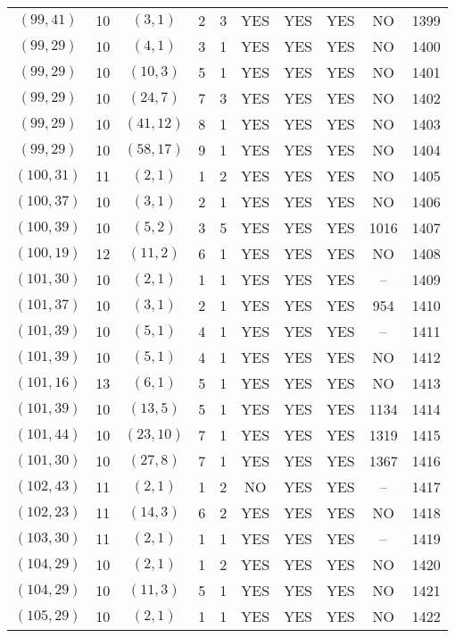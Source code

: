 \begin{longtable}{|c|c|c|c|c|c|c|c|c|c|}
$(99, 41)$ & 10 & $(3, 1)$ & 2 & 3 & YES & YES & YES & NO & 1399\\
$(99, 29)$ & 10 & $(4, 1)$ & 3 & 1 & YES & YES & YES & NO & 1400\\
$(99, 29)$ & 10 & $(10, 3)$ & 5 & 1 & YES & YES & YES & NO & 1401\\
$(99, 29)$ & 10 & $(24, 7)$ & 7 & 3 & YES & YES & YES & NO & 1402\\
$(99, 29)$ & 10 & $(41, 12)$ & 8 & 1 & YES & YES & YES & NO & 1403\\
$(99, 29)$ & 10 & $(58, 17)$ & 9 & 1 & YES & YES & YES & NO & 1404\\
$(100, 31)$ & 11 & $(2, 1)$ & 1 & 2 & YES & YES & YES & NO & 1405\\
$(100, 37)$ & 10 & $(3, 1)$ & 2 & 1 & YES & YES & YES & NO & 1406\\
$(100, 39)$ & 10 & $(5, 2)$ & 3 & 5 & YES & YES & YES & 1016 & 1407\\
$(100, 19)$ & 12 & $(11, 2)$ & 6 & 1 & YES & YES & YES & NO & 1408\\
$(101, 30)$ & 10 & $(2, 1)$ & 1 & 1 & YES & YES & YES & -- & 1409\\
$(101, 37)$ & 10 & $(3, 1)$ & 2 & 1 & YES & YES & YES & 954 & 1410\\
$(101, 39)$ & 10 & $(5, 1)$ & 4 & 1 & YES & YES & YES & -- & 1411\\
$(101, 39)$ & 10 & $(5, 1)$ & 4 & 1 & YES & YES & YES & NO & 1412\\
$(101, 16)$ & 13 & $(6, 1)$ & 5 & 1 & YES & YES & YES & NO & 1413\\
$(101, 39)$ & 10 & $(13, 5)$ & 5 & 1 & YES & YES & YES & 1134 & 1414\\
$(101, 44)$ & 10 & $(23, 10)$ & 7 & 1 & YES & YES & YES & 1319 & 1415\\
$(101, 30)$ & 10 & $(27, 8)$ & 7 & 1 & YES & YES & YES & 1367 & 1416\\
$(102, 43)$ & 11 & $(2, 1)$ & 1 & 2 & NO & YES & YES & -- & 1417\\
$(102, 23)$ & 11 & $(14, 3)$ & 6 & 2 & YES & YES & YES & NO & 1418\\
$(103, 30)$ & 11 & $(2, 1)$ & 1 & 1 & YES & YES & YES & -- & 1419\\
$(104, 29)$ & 10 & $(2, 1)$ & 1 & 2 & YES & YES & YES & NO & 1420\\
$(104, 29)$ & 10 & $(11, 3)$ & 5 & 1 & YES & YES & YES & NO & 1421\\
$(105, 29)$ & 10 & $(2, 1)$ & 1 & 1 & YES & YES & YES & NO & 1422\\

\end{longtable}
